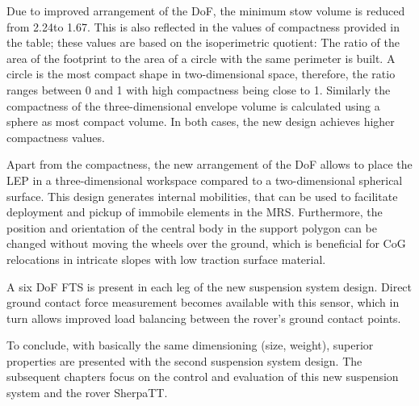 Due to improved arrangement of the \ac{DoF}, the minimum stow volume is reduced from 2.24\unitcubmeter to 1.67\unitcubmeter.
This is also reflected in the values of compactness provided in the table; these values are based on the isoperimetric quotient:
The ratio of the area of the footprint to the area of a circle with the same perimeter is built.
A circle is the most compact shape in two-dimensional space,
therefore, the ratio ranges between 0 and 1 with high compactness being close to 1.
Similarly the compactness of the three-dimensional envelope volume is calculated using a sphere as most compact volume.
In both cases, the new design achieves higher compactness values.



Apart from the compactness, the new arrangement of the \ac{DoF} allows to place the \ac{LEP} in a three-dimensional workspace compared to a two-dimensional spherical surface.
This design generates internal mobilities, that can be used to facilitate deployment and pickup of immobile elements in the \ac{MRS}.
Furthermore, the position and orientation of the central body in the support polygon can be changed without moving the wheels over the ground, which is beneficial for \ac{CoG} relocations in intricate slopes with low traction surface material.

A six \ac{DoF} \ac{FTS} is present in each leg of the new suspension system design.
Direct ground contact force measurement becomes available with this sensor, which in turn allows improved load balancing between the rover's ground contact points.

To conclude, with basically the same dimensioning (size, weight), superior properties are presented with the second suspension system design.
The subsequent chapters focus on the control and evaluation of this new suspension system and the rover SherpaTT.

